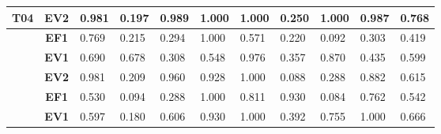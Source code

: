 \begin{table}[htbp]
\begin{tabular}{|cclllllllll|}
		\multicolumn{1}{|c|}{\multirow{-3}{*}{\cellcolor[HTML]{F2F2F2}\textbf{T04}}} & \multicolumn{1}{c|}{\textbf{EV2}} & \multicolumn{1}{l|}{0.981} & \multicolumn{1}{l|}{0.197} & \multicolumn{1}{l|}{0.989} & \multicolumn{1}{l|}{1.000} & \multicolumn{1}{l|}{1.000} & \multicolumn{1}{l|}{0.250} & \multicolumn{1}{l|}{1.000} & \multicolumn{1}{l|}{0.987} & 0.768 \\ \hline
		\rowcolor[HTML]{F2F2F2} 
		\multicolumn{1}{|c|}{\cellcolor[HTML]{F2F2F2}} & \multicolumn{1}{c|}{\cellcolor[HTML]{F2F2F2}\textbf{EF1}} & \multicolumn{1}{l|}{\cellcolor[HTML]{F2F2F2}0.769} & \multicolumn{1}{l|}{\cellcolor[HTML]{F2F2F2}0.215} & \multicolumn{1}{l|}{\cellcolor[HTML]{F2F2F2}0.294} & \multicolumn{1}{l|}{\cellcolor[HTML]{F2F2F2}1.000} & \multicolumn{1}{l|}{\cellcolor[HTML]{F2F2F2}0.571} & \multicolumn{1}{l|}{\cellcolor[HTML]{F2F2F2}0.220} & \multicolumn{1}{l|}{\cellcolor[HTML]{F2F2F2}0.092} & \multicolumn{1}{l|}{\cellcolor[HTML]{F2F2F2}0.303} & 0.419 \\ \cline{2-11} 
		\multicolumn{1}{|c|}{\cellcolor[HTML]{F2F2F2}} & \multicolumn{1}{c|}{\textbf{EV1}} & \multicolumn{1}{l|}{0.690} & \multicolumn{1}{l|}{0.678} & \multicolumn{1}{l|}{0.308} & \multicolumn{1}{l|}{0.548} & \multicolumn{1}{l|}{0.976} & \multicolumn{1}{l|}{0.357} & \multicolumn{1}{l|}{0.870} & \multicolumn{1}{l|}{0.435} & 0.599 \\ \cline{2-11} 
		\rowcolor[HTML]{F2F2F2} 
		\multicolumn{1}{|c|}{\multirow{-3}{*}{\cellcolor[HTML]{F2F2F2}\textbf{T05}}} & \multicolumn{1}{c|}{\cellcolor[HTML]{F2F2F2}\textbf{EV2}} & \multicolumn{1}{l|}{\cellcolor[HTML]{F2F2F2}0.981} & \multicolumn{1}{l|}{\cellcolor[HTML]{F2F2F2}0.209} & \multicolumn{1}{l|}{\cellcolor[HTML]{F2F2F2}0.960} & \multicolumn{1}{l|}{\cellcolor[HTML]{F2F2F2}0.928} & \multicolumn{1}{l|}{\cellcolor[HTML]{F2F2F2}1.000} & \multicolumn{1}{l|}{\cellcolor[HTML]{F2F2F2}0.088} & \multicolumn{1}{l|}{\cellcolor[HTML]{F2F2F2}0.288} & \multicolumn{1}{l|}{\cellcolor[HTML]{F2F2F2}0.882} & 0.615 \\ \hline
		\multicolumn{1}{|c|}{\cellcolor[HTML]{F2F2F2}} & \multicolumn{1}{c|}{\textbf{EF1}} & \multicolumn{1}{l|}{0.530} & \multicolumn{1}{l|}{0.094} & \multicolumn{1}{l|}{0.288} & \multicolumn{1}{l|}{1.000} & \multicolumn{1}{l|}{0.811} & \multicolumn{1}{l|}{0.930} & \multicolumn{1}{l|}{0.084} & \multicolumn{1}{l|}{0.762} & 0.542 \\ \cline{2-11} 
		\rowcolor[HTML]{F2F2F2} 
		\multicolumn{1}{|c|}{\cellcolor[HTML]{F2F2F2}} & \multicolumn{1}{c|}{\cellcolor[HTML]{F2F2F2}\textbf{EV1}} & \multicolumn{1}{l|}{\cellcolor[HTML]{F2F2F2}0.597} & \multicolumn{1}{l|}{\cellcolor[HTML]{F2F2F2}0.180} & \multicolumn{1}{l|}{\cellcolor[HTML]{F2F2F2}0.606} & \multicolumn{1}{l|}{\cellcolor[HTML]{F2F2F2}0.930} & \multicolumn{1}{l|}{\cellcolor[HTML]{F2F2F2}1.000} & \multicolumn{1}{l|}{\cellcolor[HTML]{F2F2F2}0.392} & \multicolumn{1}{l|}{\cellcolor[HTML]{F2F2F2}0.755} & \multicolumn{1}{l|}{\cellcolor[HTML]{F2F2F2}1.000} & 0.666 \\ \cline{2-11} 

\end{tabular}
\end{table}
